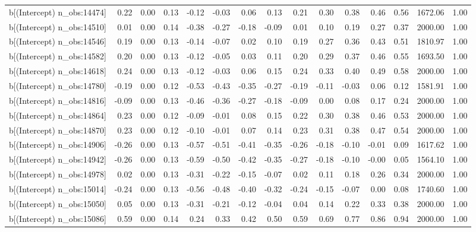 \begin{table}[ht]
\begin{tabular}{rrrrrrrrrrrrrrr}
  b[(Intercept) n\_obs:14474] & 0.22 & 0.00 & 0.13 & -0.12 & -0.03 & 0.06 & 0.13 & 0.21 & 0.30 & 0.38 & 0.46 & 0.56 & 1672.06 & 1.00 \\ 
  b[(Intercept) n\_obs:14510] & 0.01 & 0.00 & 0.14 & -0.38 & -0.27 & -0.18 & -0.09 & 0.01 & 0.10 & 0.19 & 0.27 & 0.37 & 2000.00 & 1.00 \\ 
  b[(Intercept) n\_obs:14546] & 0.19 & 0.00 & 0.13 & -0.14 & -0.07 & 0.02 & 0.10 & 0.19 & 0.27 & 0.36 & 0.43 & 0.51 & 1810.97 & 1.00 \\ 
  b[(Intercept) n\_obs:14582] & 0.20 & 0.00 & 0.13 & -0.12 & -0.05 & 0.03 & 0.11 & 0.20 & 0.29 & 0.37 & 0.46 & 0.55 & 1693.50 & 1.00 \\ 
  b[(Intercept) n\_obs:14618] & 0.24 & 0.00 & 0.13 & -0.12 & -0.03 & 0.06 & 0.15 & 0.24 & 0.33 & 0.40 & 0.49 & 0.58 & 2000.00 & 1.00 \\ 
  b[(Intercept) n\_obs:14780] & -0.19 & 0.00 & 0.12 & -0.53 & -0.43 & -0.35 & -0.27 & -0.19 & -0.11 & -0.03 & 0.06 & 0.12 & 1581.91 & 1.00 \\ 
  b[(Intercept) n\_obs:14816] & -0.09 & 0.00 & 0.13 & -0.46 & -0.36 & -0.27 & -0.18 & -0.09 & 0.00 & 0.08 & 0.17 & 0.24 & 2000.00 & 1.00 \\ 
  b[(Intercept) n\_obs:14864] & 0.23 & 0.00 & 0.12 & -0.09 & -0.01 & 0.08 & 0.15 & 0.22 & 0.30 & 0.38 & 0.46 & 0.53 & 2000.00 & 1.00 \\ 
  b[(Intercept) n\_obs:14870] & 0.23 & 0.00 & 0.12 & -0.10 & -0.01 & 0.07 & 0.14 & 0.23 & 0.31 & 0.38 & 0.47 & 0.54 & 2000.00 & 1.00 \\ 
  b[(Intercept) n\_obs:14906] & -0.26 & 0.00 & 0.13 & -0.57 & -0.51 & -0.41 & -0.35 & -0.26 & -0.18 & -0.10 & -0.01 & 0.09 & 1617.62 & 1.00 \\ 
  b[(Intercept) n\_obs:14942] & -0.26 & 0.00 & 0.13 & -0.59 & -0.50 & -0.42 & -0.35 & -0.27 & -0.18 & -0.10 & -0.00 & 0.05 & 1564.10 & 1.00 \\ 
  b[(Intercept) n\_obs:14978] & 0.02 & 0.00 & 0.13 & -0.31 & -0.22 & -0.15 & -0.07 & 0.02 & 0.11 & 0.18 & 0.26 & 0.34 & 2000.00 & 1.00 \\ 
  b[(Intercept) n\_obs:15014] & -0.24 & 0.00 & 0.13 & -0.56 & -0.48 & -0.40 & -0.32 & -0.24 & -0.15 & -0.07 & 0.00 & 0.08 & 1740.60 & 1.00 \\ 
  b[(Intercept) n\_obs:15050] & 0.05 & 0.00 & 0.13 & -0.31 & -0.21 & -0.12 & -0.04 & 0.04 & 0.14 & 0.22 & 0.33 & 0.38 & 2000.00 & 1.00 \\ 
  b[(Intercept) n\_obs:15086] & 0.59 & 0.00 & 0.14 & 0.24 & 0.33 & 0.42 & 0.50 & 0.59 & 0.69 & 0.77 & 0.86 & 0.94 & 2000.00 & 1.00 \\ 

\end{tabular}
\end{table}
